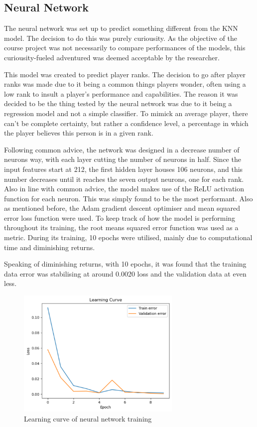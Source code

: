 \documentclass[12pt]{article}
\begin{document}
\subsection{Neural Network}
The neural network was set up to predict something different from the KNN model.
The decision to do this was purely curiousity.
As the objective of the course project was not necessarily to compare performances of the models, this curiousity-fueled adventured was deemed acceptable by the researcher.

This model was created to predict player ranks.
The decision to go after player ranks was made due to it being a common things players wonder, often using a low rank to insult a player's performance and capabilities.
The reason it was decided to be the thing tested by the neural network was due to it being a regression model and not a simple classifier.
To mimick an average player, there can't be complete certainty, but rather a confidence level, a percentage in which the player believes this person is in a given rank.

Following common advice, the network was designed in a decrease number of neurons way, with each layer cutting the number of neurons in half.
Since the input features start at 212, the first hidden layer houses 106 neurons, and this number decreases until it reaches the seven output neurons, one for each rank.
Also in line with common advice, the model makes use of the ReLU activation function for each neuron.
This was simply found to be the most performant.
Also as mentioned before, the Adam gradient descent optimiser and mean squared error loss function were used.
To keep track of how the model is performing throughout its training, the root means squared error function was used as a metric.
During its training, 10 epochs were utilised, mainly due to computational time and diminishing returns.

Speaking of diminishing returns, with 10 epochs, it was found that the training data error was stabilising at around 0.0020 loss and the validation data at even less.
\begin{figure}[H]
	\centering
	\includegraphics[width=0.7\textwidth]{nn-learning-curve}
	\caption{Learning curve of neural network training}
	\label{fig:nn-learning-curve}
\end{figure}
\end{document}
